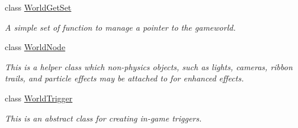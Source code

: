 \begin{DoxyCompactItemize}
class \hyperlink{classphys_1_1WorldGetSet}{WorldGetSet}
\begin{DoxyCompactList}\small\item\em A simple set of function to manage a pointer to the gameworld. \item\end{DoxyCompactList}\item 
class \hyperlink{classphys_1_1WorldNode}{WorldNode}
\begin{DoxyCompactList}\small\item\em This is a helper class which non-\/physics objects, such as lights, cameras, ribbon trails, and particle effects may be attached to for enhanced effects. \item\end{DoxyCompactList}\item 
class \hyperlink{classphys_1_1WorldTrigger}{WorldTrigger}
\begin{DoxyCompactList}\small\item\em This is an abstract class for creating in-\/game triggers. \item\end{DoxyCompactList}\end{DoxyCompactItemize}
